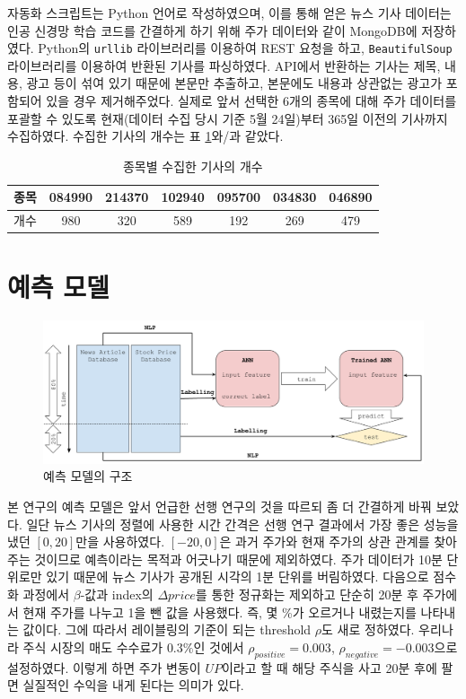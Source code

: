 \documentclass[a4paper,10pt]{article}
\begin{document}
자동화 스크립트는 Python 언어로 작성하였으며, 이를 통해 얻은 뉴스 기사 데이터는 인공 신경망 학습 코드를 간결하게 하기 위해 주가 데이터와 같이 MongoDB에 저장하였다.
Python의 \texttt{urllib} 라이브러리를 이용하여 REST 요청을 하고, \texttt{BeautifulSoup} 라이브러리를 이용하여 반환된 기사를 파싱하였다.
API에서 반환하는 기사는 제목, 내용, 광고 등이 섞여 있기 때문에 본문만 추출하고, 본문에도 내용과 상관없는 광고가 포함되어 있을 경우 제거해주었다.
실제로 앞서 선택한 6개의 종목에 대해 주가 데이터를 포괄할 수 있도록 현재(데이터 수집 당시 기준 5월 24일)부터 365일 이전의 기사까지 수집하였다.
수집한 기사의 개수는 표 \ref{tbl:number_of_articles}와/과 같았다.
\begin{table}[h]
\begin{tabular}{|c||c|c|c|c|c|c|}
\hline
종목 & 084990 & 214370 & 102940 & 095700 & 034830 & 046890 \\
\hline
개수 & 980 & 320 & 589 & 192 & 269 & 479 \\
\hline
\end{tabular}
\centering
\caption{종목별 수집한 기사의 개수}
\label{tbl:number_of_articles}
\end{table}

\section{예측 모델}

\begin{figure}[h]
\includegraphics[width=\textwidth]{model}
\centering
\caption{예측 모델의 구조}
\label{fig:model}
\end{figure}

본 연구의 예측 모델은 앞서 언급한 선행 연구의 것을 따르되 좀 더 간결하게 바꿔 보았다.
일단 뉴스 기사의 정렬에 사용한 시간 간격은 선행 연구 결과에서 가장 좋은 성능을 냈던 $[0, 20]$만을 사용하였다.
$[-20, 0]$은 과거 주가와 현재 주가의 상관 관계를 찾아주는 것이므로 예측이라는 목적과 어긋나기 때문에 제외하였다.
주가 데이터가 10분 단위로만 있기 때문에 뉴스 기사가 공개된 시각의 1분 단위를 버림하였다.
다음으로 점수화 과정에서 $\beta$-값과 index의 $\Delta price$를 통한 정규화는 제외하고 단순히 20분 후 주가에서 현재 주가를 나누고 1을 뺀 값을 사용했다.
즉, 몇 \%가 오르거나 내렸는지를 나타내는 값이다.
그에 따라서 레이블링의 기준이 되는 threshold $\rho$도 새로 정하였다.
우리나라 주식 시장의 매도 수수료가 $0.3\%$인 것에서 $\rho_{positive}=0.003$, $\rho_{negative}=-0.003$으로 설정하였다.
이렇게 하면 주가 변동이 $UP$이라고 할 때 해당 주식을 사고 20분 후에 팔면 실질적인 수익을 내게 된다는 의미가 있다.
\end{document}
